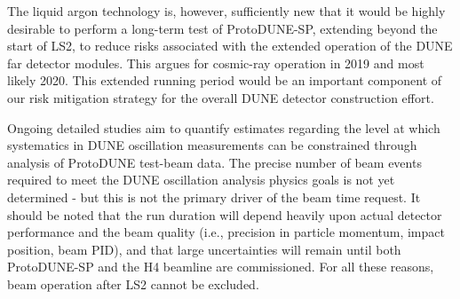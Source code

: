 The liquid argon technology is, however, sufficiently new that it would be highly desirable to perform a long-term test of ProtoDUNE-SP, extending beyond the start of LS2, to reduce risks associated with the extended operation of the DUNE far detector modules. This argues for cosmic-ray operation in 2019 and most likely 2020. This extended running period would be an important component of our risk mitigation strategy for the overall DUNE detector construction effort. 




Ongoing detailed studies aim to quantify estimates regarding the level at which systematics in DUNE oscillation measurements can be constrained through analysis of ProtoDUNE test-beam data. The precise number of beam events required to meet the DUNE oscillation analysis physics goals is not yet determined - but this is not the primary driver of the beam time request.
It should be noted that the run duration will depend heavily upon actual detector performance and the beam quality (i.e., precision in particle momentum, impact position, beam PID), and that large uncertainties will remain until both ProtoDUNE-SP and the H4 beamline are commissioned. For all these reasons, beam operation after LS2 cannot be excluded.


